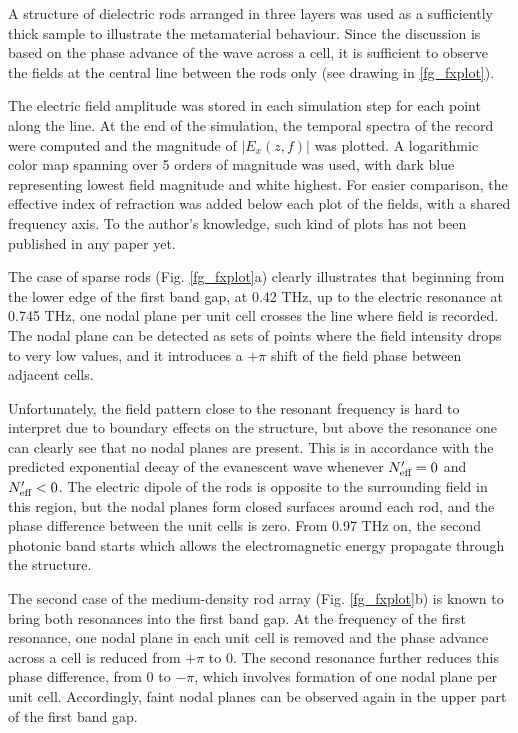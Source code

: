 A structure of dielectric rods arranged in three layers was used as a sufficiently thick sample to illustrate the metamaterial behaviour. Since the discussion is based on the phase advance of the wave across a cell, it is sufficient to observe the fields at the central line between the rods only (see drawing in \ref{fg_fxplot}).

The electric field amplitude was stored in each simulation step for each point along the line.
At the end of the simulation, the temporal spectra of the record were computed and the magnitude of $|E_x(z, f)|$ was plotted. A logarithmic color map spanning over 5 orders of magnitude was used, with dark blue representing lowest field magnitude and white highest. For easier comparison, the effective index of refraction was added below each plot of the fields, with a shared frequency axis.
To the author's knowledge, such kind of plots has not been published in any paper yet. 

The case of sparse rods (Fig. \ref{fg_fxplot}a) clearly illustrates that beginning from the lower edge of the first band gap, at 0.42 THz, up to the electric resonance at 0.745 THz, one nodal plane per unit cell crosses the line where field is recorded. The nodal plane can be detected as sets of points where the field intensity drops to very low values, and it introduces a $+\pi$ shift of the field phase between adjacent cells. 

Unfortunately, the field pattern close to the resonant frequency is hard to interpret due to boundary effects on the structure, but above the resonance one can clearly see that no nodal planes are present. This is in accordance with the predicted exponential decay of the evanescent wave whenever $N_{\text{eff} }' = 0$ and $N_{\text{eff} }' < 0$. The electric dipole of the rods is opposite to the surrounding field in this region, but the nodal planes form closed surfaces around each rod, and the phase difference between the unit cells is zero. From 0.97 THz on, the second photonic band starts which allows the electromagnetic energy propagate through the structure.

The second case of the medium-density rod array (Fig. \ref{fg_fxplot}b) is known to bring both resonances into the first band gap. At the frequency of the first resonance, one nodal plane in each unit cell is removed and the phase advance across a cell is reduced from $+\pi$ to $0$. The second resonance further reduces this phase difference, from $0$ to $-\pi$, which involves formation of one nodal plane per unit cell. Accordingly, faint nodal planes can be observed again in the upper part of the first band gap. 

